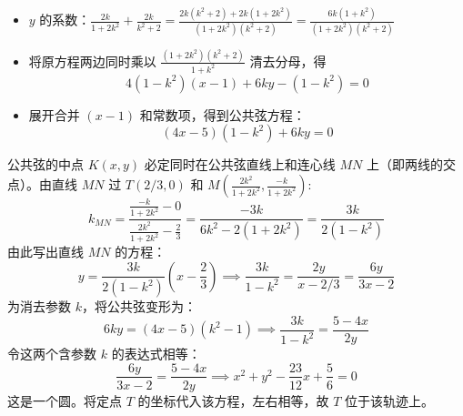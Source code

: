 \begin{solution}
\begin{itemize}
\item $y$ 的系数：$\frac{2k}{1+2k^2} + \frac{2k}{k^2+2} = \frac{2k(k^2+2) + 2k(1+2k^2)}{(1+2k^2)(k^2+2)} = \frac{6k(1+k^2)}{(1+2k^2)(k^2+2)}$
\item 将原方程两边同时乘以 $\frac{(1+2k^2)(k^2+2)}{1+k^2}$ 清去分母，得 $$4(1-k^2)(x-1) + 6ky - (1-k^2) = 0$$
\item 展开合并 $(x-1)$ 和常数项，得到公共弦方程：$$(4x-5)(1-k^2) + 6ky = 0 $$
\end{itemize}
公共弦的中点 $K(x,y)$ 必定同时在公共弦直线上和连心线 $MN$ 上（即两线的交点）。由直线 $MN$ 过 $T(2/3, 0)$ 和 $M\left( \frac{2k^2}{1+2k^2}, \frac{-k}{1+2k^2} \right)$:
 \[k_{MN} = \frac{ \frac{-k}{1+2k^2} - 0 }{ \frac{2k^2}{1+2k^2} - \frac{2}{3} } = \frac{-3k}{6k^2 - 2(1+2k^2)} = \frac{3k}{2(1-k^2)}\]
 由此写出直线 $MN$ 的方程：$$y = \frac{3k}{2(1-k^2)} \left( x - \frac{2}{3} \right) \implies \frac{3k}{1-k^2} = \frac{2y}{x - 2/3} = \frac{6y}{3x - 2} $$
 为消去参数 $k$，将公共弦变形为：$$6ky = (4x-5)(k^2-1) \implies \frac{3k}{1-k^2} = \frac{5-4x}{2y}$$
 令这两个含参数 $k$ 的表达式相等：$$\frac{6y}{3x - 2} = \frac{5 - 4x}{2y}\implies x^2 + y^2 - \frac{23}{12}x + \frac{5}{6} = 0$$这是一个圆。将定点 $T$ 的坐标代入该方程，左右相等，故 $T$ 位于该轨迹上。
\end{solution}

